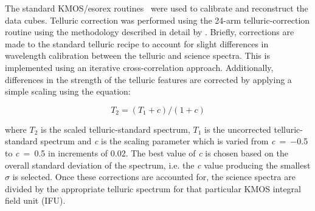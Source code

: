 \documentclass[useAMS,usenatbib]{mn2e}
\begin{document}
The standard KMOS/esorex routines~\citep[SPARK;][]{2013A&A...558A..56D} were used to calibrate and reconstruct the data cubes.
Telluric correction was performed using the 24-arm telluric-correction routine using the methodology described in detail by
\citet{2015ApJ...803...14P}.
Briefly, corrections are made to the standard telluric recipe to account for slight differences in wavelength calibration between the telluric and science spectra.
This is implemented using an iterative cross-correlation approach.
Additionally, differences in the strength of the telluric features are corrected by applying a simple scaling using the equation:

\begin{equation}
  T_{2} = (T_{1} + c) / (1 + c)
\end{equation}

\noindent where $T_{2}$ is the scaled telluric-standard spectrum, $T_{1}$ is the uncorrected telluric-standard spectrum and {\it c} is the scaling parameter which is varied from {\it c}~=~$-$0.5 to {\it c}~=~0.5 in increments of 0.02.
The best value of {\it c} is chosen based on the overall standard deviation of the spectrum, i.e. the {\it c} value producing the smallest $\sigma$ is selected.
Once these corrections are accounted for, the science spectra are divided by the appropriate telluric spectrum for that particular KMOS integral field unit (IFU).
\end{document}
